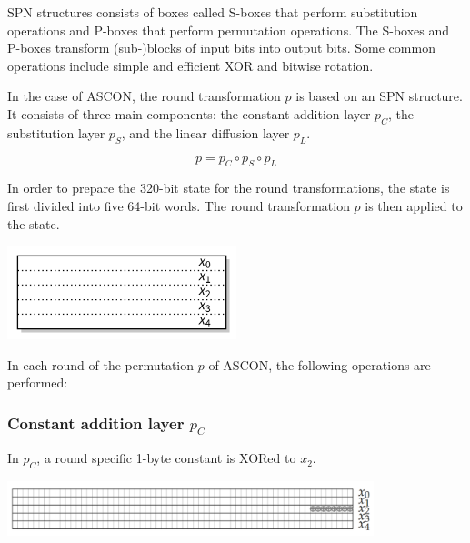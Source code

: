 SPN structures consists of boxes called S-boxes that perform substitution operations and P-boxes that perform permutation operations. The S-boxes and P-boxes transform (sub-)blocks of input bits into output bits. Some common operations include simple and efficient XOR and bitwise rotation. \cite{mustafeez}

In the case of ASCON, the round transformation $p$ is based on an SPN structure. It consists of three main components: the constant addition  layer $p_C$, the substitution layer $p_S$, and the linear diffusion layer $p_L$. \cite{DBLP:journals/joc/DobraunigEMS21, ascon_specification} \par

\[p=p_C \circ p_S \circ p_L\]

In order to prepare the 320-bit state for the round transformations, the state is first divided into five 64-bit words. The round transformation $p$ is then applied to the state. \cite{DBLP:journals/joc/DobraunigEMS21} \par 

\begin{center}
  \centering 
  \includegraphics[width=0.5\textwidth]{images/state.png}
  \label{fig:state}
\end{center}

In each round of the permutation $p$ of ASCON, the following operations are performed:

\subsubsection{Constant addition layer $p_C$}
In $p_C$, a round specific 1-byte constant is XORed to $x_2$. \cite{ascon_specification, analysis_of_ascon}

\begin{center}
  \centering 
  \includegraphics[width=0.8\textwidth]{images/constant.png}
  \label{fig:constant}
\end{center}

